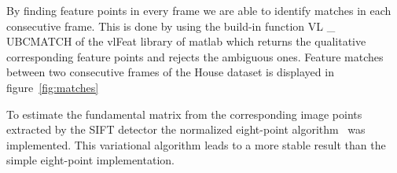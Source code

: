 By finding feature points in every frame we are able to identify matches in each consecutive frame. This is done by using the build-in function VL \_ UBCMATCH of the vlFeat library of matlab which returns the qualitative corresponding feature points and rejects the ambiguous ones. Feature matches between two consecutive frames of the House dataset is displayed in figure~\ref{fig:matches}  

To estimate the fundamental matrix from the corresponding image points extracted by the SIFT detector the normalized eight-point algorithm~\cite{eight-point} was implemented. This variational algorithm leads to a more stable result than the simple eight-point implementation.  